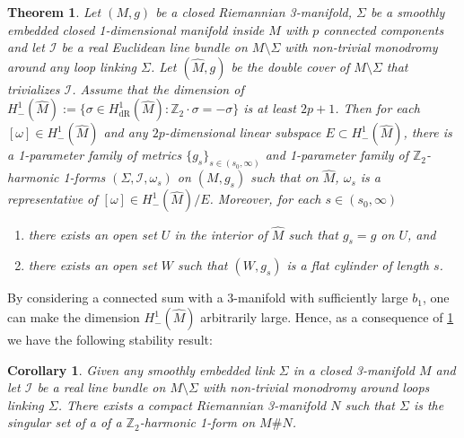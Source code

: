 \documentclass[preprint,12pt]{elsarticle}
\numberwithin{table}{section}
\newtheorem{theorem}[lemma]{Theorem}
\newtheorem{corollary}[lemma]{Corollary}
\newcommand{\Z}{\mathbb{Z}}
\begin{document}
\begin{theorem}
	\label{thm:main-theorem}
	Let $(M,g)$ be a closed Riemannian 3-manifold, $\Sigma$ be a smoothly embedded closed 1-dimensional manifold inside $M$ with $p$ connected components and let $\mathcal{I}$ be a real Euclidean line bundle on $M \setminus \Sigma$ with non-trivial monodromy around any loop linking $\Sigma$.
	Let $(\hat{M}, g)$ be the double cover of $M \setminus \Sigma$ that trivializes $\mathcal{I}$. Assume that the dimension of $H^1_-(\hat{M}) := \{ \sigma \in H^1_{\mathrm{dR}} (\hat{M}) \colon \Z_2 \cdot \sigma = - \sigma \}$ is at least $2p + 1$.
	Then for each $[\omega] \in H^1_{-}(\hat M)$ and any $2p$-dimensional linear subspace $E \subset H^1_-(\hat M)$, there is a 1-parameter family of metrics $\{g_s\}_{s \in (s_0, \infty)}$ and 1-parameter family of $\Z_2$-harmonic 1-forms $(\Sigma, \mathcal{I}, \omega_s)$ on $(M, g_s)$ such that on $\hat M$, $\omega_s$ is a representative of $[\omega] \in H^1_-(\hat{M}) / E$.
	Moreover, for each $s \in (s_0, \infty)$
	\begin{enumerate}
		\item there exists an open set $U$ in the interior of $\hat{M}$ such that $g_s = g$ on $U$, and
		\item there exists an open set $W$ such that $(W, g_s)$ is a flat cylinder of length $s$.
	\end{enumerate}
\end{theorem}
By considering a connected sum with a 3-manifold with sufficiently large $b_1$, one can make the dimension $H^1_-(\hat M)$ arbitrarily large. Hence, as a consequence of \cref{thm:main-theorem} we have the following stability result:
\begin{corollary}
	\label{cor:main-cor-existence}
	Given any smoothly embedded link $\Sigma$ in a closed 3-manifold $M$ and let $\mathcal{I}$ be a real line bundle on $M \setminus \Sigma$ with non-trivial monodromy around loops linking $\Sigma$.
	There exists a compact Riemannian 3-manifold $N$ such that $\Sigma$ is the singular set of a of a $\Z_2$-harmonic 1-form on $M \# N$.
\end{corollary}
\end{document}
